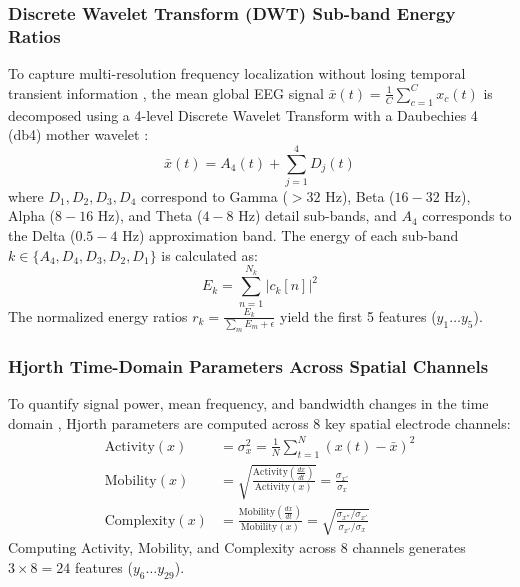 \documentclass[pdflatex,sn-mathphys-num]{sn-jnl}%
\begin{document}
\subsubsection{Discrete Wavelet Transform (DWT) Sub-band Energy Ratios}
To capture multi-resolution frequency localization without losing temporal transient information \cite{sharma2024time, kashefiamiri2025epileptic}, the mean global EEG signal $\bar{x}(t) = \frac{1}{C}\sum_{c=1}^{C} x_c(t)$ is decomposed using a 4-level Discrete Wavelet Transform with a Daubechies 4 (db4) mother wavelet \cite{daubechies1992ten, mallat1989theory}:
\begin{equation}
\bar{x}(t) = A_4(t) + \sum_{j=1}^{4} D_j(t)
\end{equation}
where $D_1, D_2, D_3, D_4$ correspond to Gamma ($>32\text{ Hz}$), Beta ($16-32\text{ Hz}$), Alpha ($8-16\text{ Hz}$), and Theta ($4-8\text{ Hz}$) detail sub-bands, and $A_4$ corresponds to the Delta ($0.5-4\text{ Hz}$) approximation band. The energy of each sub-band $k \in \{A_4, D_4, D_3, D_2, D_1\}$ is calculated as:
\begin{equation}
E_k = \sum_{n=1}^{N_k} \vert c_k[n] \vert^2
\end{equation}
The normalized energy ratios $r_k = \frac{E_k}{\sum_{m} E_m + \epsilon}$ yield the first 5 features ($y_1 \dots y_5$).

\subsubsection{Hjorth Time-Domain Parameters Across Spatial Channels}
To quantify signal power, mean frequency, and bandwidth changes in the time domain \cite{hjorth1970eeg, kumar2024hjorth}, Hjorth parameters are computed across 8 key spatial electrode channels:
\begin{align}
\text{Activity}(x) &= \sigma_x^2 = \frac{1}{N}\sum_{t=1}^{N}(x(t) - \bar{x})^2 \label{eq_hjorth1} \\
\text{Mobility}(x) &= \sqrt{\frac{\text{Activity}(\frac{dx}{dt})}{\text{Activity}(x)}} = \frac{\sigma_{x'}}{\sigma_x} \label{eq_hjorth2} \\
\text{Complexity}(x) &= \frac{\text{Mobility}(\frac{dx}{dt})}{\text{Mobility}(x)} = \sqrt{\frac{\sigma_{x''}/\sigma_{x'}}{\sigma_{x'}/\sigma_x}} \label{eq_hjorth3}
\end{align}
Computing Activity, Mobility, and Complexity across 8 channels generates $3 \times 8 = 24$ features ($y_6 \dots y_{29}$).
\end{document}
